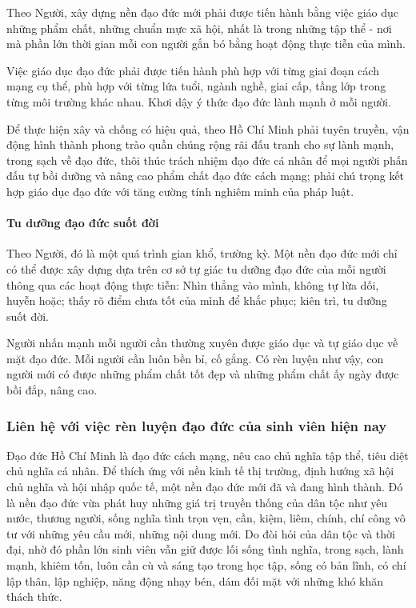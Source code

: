 Theo Người, xây dựng nền đạo đức mới phải được tiến hành bằng việc giáo dục những phẩm chất, những chuẩn mực xã hội, nhất là trong những tập thể - nơi mà phần lớn thời gian mỗi con người gắn bó bằng hoạt động thực tiễn của mình.

Việc giáo dục đạo đức phải được tiến hành phù hợp với từng giai đoạn cách mạng cụ thể, phù hợp với từng lứa tuổi, ngành nghề, giai cấp, tầng lớp trong từng môi trường khác nhau. Khơi dậy ý thức đạo đức lành mạnh ở mỗi người.

Để thực hiện xây và chống có hiệu quả, theo Hồ Chí Minh phải tuyên truyền, vận động hình thành phong trào quần chúng rộng rãi đấu tranh cho sự lành mạnh, trong sạch về đạo đức, thôi thúc trách nhiệm đạo đức cá nhân để mọi người phấn đấu tự bồi dưỡng và nâng cao phẩm chất đạo đức cách mạng; phải chú trọng kết hợp giáo dục đạo đức với tăng cường tính nghiêm minh của pháp luật.

\paragraph{Tu dưỡng đạo đức suốt đời}
Theo Người, đó là một quá trình gian khổ, trường kỳ. Một nền đạo đức mới chỉ có thể được xây dựng dựa trên cơ sở tự giác tu dưỡng đạo đức của mỗi người thông qua các hoạt động thực tiễn: Nhìn thẳng vào mình, không tự lừa dối, huyễn hoặc; thấy rõ điểm chưa tốt của mình để khắc phục; kiên trì, tu dưỡng suốt đời.

Người nhấn mạnh mỗi người cần thường xuyên được giáo dục và tự giáo dục về mặt đạo đức. Mỗi người cần luôn bền bỉ, cố gắng. Có rèn luyện như vậy, con người mới có được những phẩm chất tốt đẹp và những phẩm chất ấy ngày được bồi đắp, nâng cao.

\subsubsection{Liên hệ với việc rèn luyện đạo đức của sinh viên hiện nay}

Đạo đức Hồ Chí Minh là đạo đức cách mạng, nêu cao chủ nghĩa tập thể, tiêu diệt chủ nghĩa cá nhân. Để thích ứng với nền kinh tế thị trường, định hướng xã hội chủ nghĩa và hội nhập quốc tế, một nền đạo đức mới đã và đang hình thành. Đó là nền đạo đức vừa phát huy những giá trị truyền thống của dân tộc như yêu nước, thương người, sống nghĩa tình trọn vẹn, cần, kiệm, liêm, chính, chí công vô tư với những yêu cầu mới, những nội dung mới. Do đòi hỏi của dân tộc và thời đại, nhờ đó phần lớn sinh viên vẫn giữ được lối sống tình nghĩa, trong sạch, lành mạnh, khiêm tốn, luôn cần cù và sáng tạo trong học tập, sống có bản lĩnh, có chí lập thân, lập nghiệp, năng động nhạy bén, dám đối mặt với những khó khăn thách thức.

